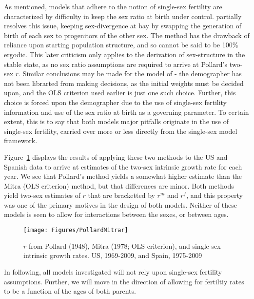 \FloatBarrier
As mentioned, models that adhere to the notion of single-sex fertility are
characterized by difficulty in keep the sex ratio at birth under control.
\citet{pollard1948measurement} partially resolves this issue, keeping
sex-divergence at bay by swapping the generation of birth of each sex to
progenitors of the other sex. The method has the drawback of reliance upon
starting population structure, and so cannot be said to be 100\% ergodic. This
later criticism only applies to the derivation of sex-structure in the stable
state, as no sex ratio assumptions are required to arrive at Pollard's two-sex
$r$. Similar conclusions may be made for the model of
\citet{mitra1978derivation}- the demographer has not been librarted from making
decisions, as the initial weights must be decided upon, and the OLS criterion
used earlier is just one such choice. Further, this choice is forced upon the
demographer due to the use of single-sex fertility information and use of the
sex ratio at birth as a governing parameter. To certain extent, this is to say
that both models major pitfalls originate in the use of single-sex fertility,
carried over more or less directly from the single-sex model framework.

Figure~\ref{fig:PollardMitrar} displays the results of applying these two
methods to the US and Spanish data to arrive at estimates of the two-sex 
intrinsic growth rate for each year. We see that
Pollard's method yields a somewhat higher estimate than the Mitra (OLS
criterion) method, but that differences are minor. Both methods yield two-sex
estimates of $r$ that are bracketted by $r^m$ and $r^f$, and this property was
one of the primary motives in the design of both models. Neither of these models
is seen to allow for interactions between the sexes, or between ages.

\begin{figure}[ht!]
        \centering  
          \caption{$r$ from Pollard (1948), Mitra (1978; OLS criterion),
          and single sex intrinsic growth rates. US, 1969-2009, and Spain, 1975-2009}
           \texttt{[image: Figures/PollardMitrar]}
          \label{fig:PollardMitrar}
\end{figure}

In following, all models investigated will not rely upon single-sex fertility
assumptions. Further, we will move in the direction of allowing for fertiltiy
rates to be a function of the ages of both parents.

\FloatBarrier


